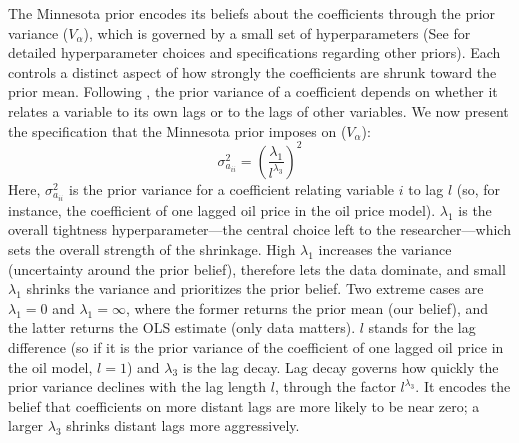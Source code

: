 \documentclass[12pt, a4paper]{article}
\begin{document}
The Minnesota prior encodes its beliefs about the coefficients through the prior variance ($V_\alpha$), which is governed by a small set of hyperparameters (See \citet{dieppeBEARToolbox2016} for detailed hyperparameter choices and specifications regarding other priors). Each controls a distinct aspect of how strongly the coefficients are shrunk toward the prior mean. Following \citet{littermanForecastingBayesianVector1986}, the prior variance of a coefficient depends on whether it relates a variable to its own lags or to the lags of other variables. We now present the specification that the Minnesota prior imposes on ($V_\alpha$):
\begin{equation} \label{eq:24}
\sigma_{a_{ii}}^2 = \left( \frac{\lambda_1}{l^{\lambda_3}} \right)^2
\end{equation}
Here, $\sigma_{a_{ii}}^2$ is the prior variance for a coefficient relating variable $i$ to lag $l$ (so, for instance, the coefficient of one lagged oil price in the oil price model). $\lambda_1$ is the overall tightness hyperparameter—the central choice left to the researcher—which sets the overall strength of the shrinkage. High $\lambda_1$ increases the variance (uncertainty around the prior belief), therefore lets the data dominate, and small $\lambda_1$ shrinks the variance and prioritizes the prior belief. Two extreme cases are $\lambda_1 = 0$ and $\lambda_1 = \infty$, where the former returns the prior mean (our belief), and the latter returns the OLS estimate (only data matters). $l$ stands for the lag difference (so if it is the prior variance of the coefficient of one lagged oil price in the oil model, $l = 1$) and $\lambda_3$ is the lag decay. Lag decay governs how quickly the prior variance declines with the lag length $l$, through the factor $l^{\lambda_3}$. It encodes the belief that coefficients on more distant lags are more likely to be near zero; a larger $\lambda_3$ shrinks distant lags more aggressively.
\end{document}
